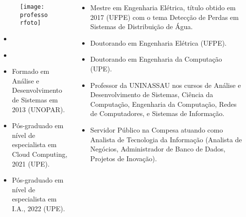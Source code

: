 \begin{frame}[t]

    \begin{columns}[onlytextwidth,T]

        \begin{column}[T]{0.48\linewidth}
            \begin{figure}[htb]
              \centering{}
              \texttt{[image: \\professorfoto]}

              \textbf{\href{\professorlattes}{\professor}}
            \end{figure}

            \begin{itemize}
              \justifying{}
              \setlength\itemsep{1ex}
              \item \href{\professorsite}{\professorsite}
              \item \href{\professorlattes}{\professorlattes}
              \item Formado em Análise e Desenvolvimento de Sistemas em 2013 (UNOPAR).
              \item Pós-graduado em nível de especialista em Cloud Computing, 2021 (UPE).
              \item Pós-graduado em nível de especialista em I.A., 2022 (UPE).
            \end{itemize}
        \end{column}

        \begin{column}{0.48\linewidth}
            \small
            \begin{itemize}\small
                \justifying{}
                \setlength\itemsep{1ex}
                \item Mestre em Engenharia Elétrica, título obtido em 2017 (UFPE) com o tema Detecção de Perdas em Sistemas de Distribuição de Água.
                \item Doutorando em Engenharia Elétrica (UFPE).
                \item Doutorando em Engenharia da Computação (UPE).
                \item Professor da UNINASSAU nos cursos de Análise e Desenvolvimento de Sistemas, Ciência da Computação, Engenharia da Computação, Redes de Computadores, e Sistemas de Informação.
                \item Servidor Público na Compesa atuando como Analista de Tecnologia da Informação (Analista de Negócios, Administrador de Banco de Dados, Projetos de Inovação).
            \end{itemize}
        \end{column}

    \end{columns}

\end{frame}
